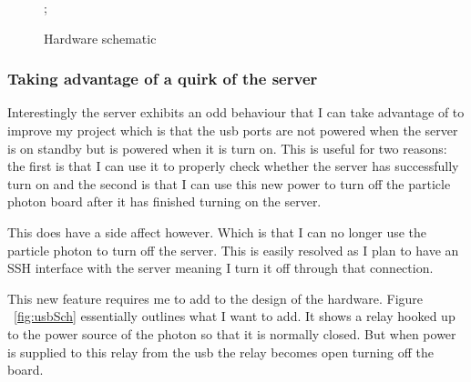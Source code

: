 \documentclass{article}
\begin{document}
\begin{figure}[H]
    \noindent{};
    \caption{Hardware schematic} \label{fig:turnOnRelay}
\end{figure}


\subsubsection{Taking advantage of a quirk of the server}
Interestingly the server exhibits an odd behaviour that I can take advantage of to improve my
project which is that the usb ports are not powered when the server is on standby but is powered
when it is turn on. This is useful for two reasons: the first is that I can use it to properly
check whether the server has successfully turn on and the second is that I can use this new
power to turn off the particle photon board after it has finished turning on the server.

This does have a side affect however. Which is that I can no longer use the particle
photon to turn off the server. This is easily resolved as I plan to have an SSH interface
with the server meaning I turn it off through that connection.

This new feature requires me to add to the design of the hardware. Figure ~\ref{fig:usbSch}
essentially outlines what I want to add. It shows a relay hooked up to the power source of
the photon so that it is normally closed. But when power is supplied to this relay from the
usb the relay becomes open turning off the board.
\end{document}
